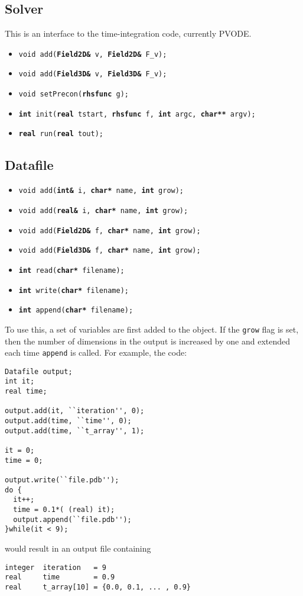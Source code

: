 \documentclass[12pt, a4paper]{article}
\newcommand{\code}[1]{\texttt{#1}}
\begin{document}
\subsection{Solver}

This is an interface to the time-integration code, currently PVODE.

\begin{itemize}
\item \code{void add({\bf Field2D\&} v, {\bf Field2D\&} F\_v);}
\item \code{void add({\bf Field3D\&} v, {\bf Field3D\&} F\_v);}
\item \code{void setPrecon({\bf rhsfunc} g);}
\item \code{{\bf int} init({\bf real} tstart, {\bf rhsfunc} f, {\bf int} argc, {\bf char**} argv);}
\item \code{{\bf real} run({\bf real} tout);}
\end{itemize}

\subsection{Datafile}

\begin{itemize}
\item \code{void add({\bf int\&} i, {\bf char*} name, {\bf int} grow);}
\item \code{void add({\bf real\&} i, {\bf char*} name, {\bf int} grow);}
\item \code{void add({\bf Field2D\&} f, {\bf char*} name, {\bf int} grow);}
\item \code{void add({\bf Field3D\&} f, {\bf char*} name, {\bf int} grow);}
\item \code{{\bf int} read({\bf char*} filename);}
\item \code{{\bf int} write({\bf char*} filename);}
\item \code{{\bf int} append({\bf char*} filename);}
\end{itemize}

To use this, a set of variables are first added to the object. If the \code{grow}
flag is set, then the number of dimensions in the output is increased by one and extended
each time \code{append} is called. For example, the code:
\begin{verbatim}
Datafile output;
int it;
real time;

output.add(it, ``iteration'', 0);
output.add(time, ``time'', 0);
output.add(time, ``t_array'', 1);

it = 0;
time = 0;

output.write(``file.pdb'');
do {
  it++;
  time = 0.1*( (real) it);
  output.append(``file.pdb'');
}while(it < 9);
\end{verbatim}
would result in an output file containing
\begin{verbatim}
integer  iteration   = 9
real     time        = 0.9   
real     t_array[10] = {0.0, 0.1, ... , 0.9}
\end{verbatim}
\end{document}
